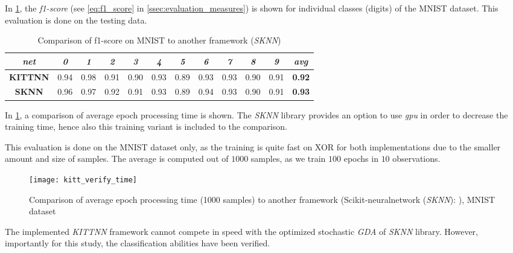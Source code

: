 In \cref{tab:kitt_verify_f1}, the \textit{f1-score} (see \cref{eq:f1_score} in \cref{ssec:evaluation_measures}) is shown for individual classes (digits) of the MNIST dataset. This evaluation is done on the testing data.

\begin{table}[H]
\centering
\caption{Comparison of f1-score on MNIST to another framework (\textit{SKNN})}
\label{tab:kitt_verify_f1}
\resizebox{\textwidth}{!} {
\begin{tabular}{|c|c|c|c|c|c|c|c|c|c|c|c|}
\hline
\textit{net}  & \textit{0} & \textit{1} & \textit{2} & \textit{3} & \textit{4} & \textit{5} & \textit{6} & \textit{7} & \textit{8} & \textit{9} & \textit{avg}  \\ \hline
\textbf{KITTNN} & 0.94       & 0.98       & 0.91       & 0.90       & 0.93       & 0.89       & 0.93       & 0.93       & 0.90       & 0.91       & \textbf{0.92} \\ \hline
\textbf{SKNN} & 0.96       & 0.97       & 0.92       & 0.91       & 0.93       & 0.89       & 0.94       & 0.93       & 0.90       & 0.91       & \textbf{0.93} \\ \hline
\end{tabular}
}
\end{table}

In \cref{fig:kitt_verify_time}, a comparison of average epoch processing time is shown. The \textit{SKNN} library provides an option to use \textit{gpu} in order to decrease the training time, hence also this training variant is included to the comparison.

This evaluation is done on the MNIST dataset only, as the training is quite fast on XOR for both implementations due to the smaller amount and size of samples. The average is computed out of $ 1000 $ samples, as we train $ 100 $ epochs in $ 10 $ observations.

\begin{figure}[H]
  \centering
  \texttt{[image: kitt\_verify\_time]}
  \caption{Comparison of average epoch processing time (1000 samples) to another framework (Scikit-neuralnetwork (\textit{SKNN}): \citep{misc:sknn}), MNIST dataset}
  \label{fig:kitt_verify_time}
\end{figure}

The implemented \textit{KITTNN} framework cannot compete in speed with the optimized stochastic \textit{GDA} of \textit{SKNN} library. However, importantly for this study, the classification abilities have been verified.

